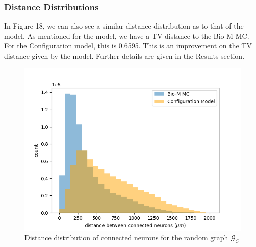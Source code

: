 \subsubsection{Distance Distributions}
In Figure 18, we can also see a similar distance distribution as to that of the \ER model. As mentioned for the \ER model, we have a TV distance to the Bio-M MC. For the Configuration model, this is 0.6595. This is an improvement on the TV distance given by the \ER model. Further details are given in the Results section.
\begin{figure}[H]
\begin{center}
\captionsetup{justification=centering}
\includegraphics[width=12cm]{configuration/configuration_dist_distr.png}
\caption{Distance distribution of connected neurons for the random graph $\mathcal{G}_C$}
\end{center}
\end{figure}
